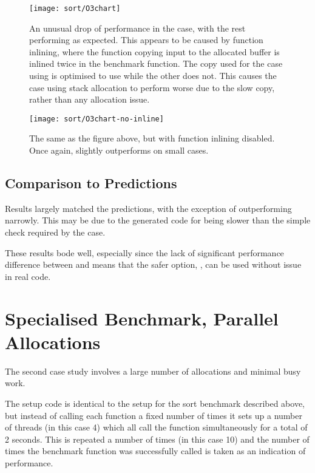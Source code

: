 \begin{figure}[ph]
	\centering
	\texttt{[image: sort/O3chart]}
	\caption{An unusual drop of performance in the  case, with the rest performing as expected. This appears to be caused by function inlining, where the function copying input to the allocated buffer is inlined twice in the  benchmark function. The copy used for the case using \malloc{} is optimised to use  while the other does not. This causes the case using stack allocation to perform worse due to the slow copy, rather than any allocation issue.}
\end{figure}

\begin{figure}[ph]
	\centering
	\texttt{[image: sort/O3chart-no-inline]}
	\caption{The same as the figure above, but with function inlining disabled. Once again,  slightly outperforms  on small cases.}\label{lastsort}
\end{figure}

\subsection{Comparison to Predictions}

Results largely matched the predictions, with the exception of  outperforming  narrowly. This may be due to the generated code for  being slower than the simple check required by the  case.

These results bode well, especially since the lack of significant performance difference between  and  means that the safer option, , can be used without issue in real code.

\pagebreak

\section{Specialised Benchmark, Parallel Allocations}

The second case study involves a large number of allocations and minimal busy work.

The setup code is identical to the setup for the sort benchmark described above, but instead of calling each function a fixed number of times it sets up a number of threads (in this case 4) which all call the function simultaneously for a total of 2 seconds. This is repeated a number of times (in this case 10) and the number of times the benchmark function was successfully called is taken as an indication of performance.

